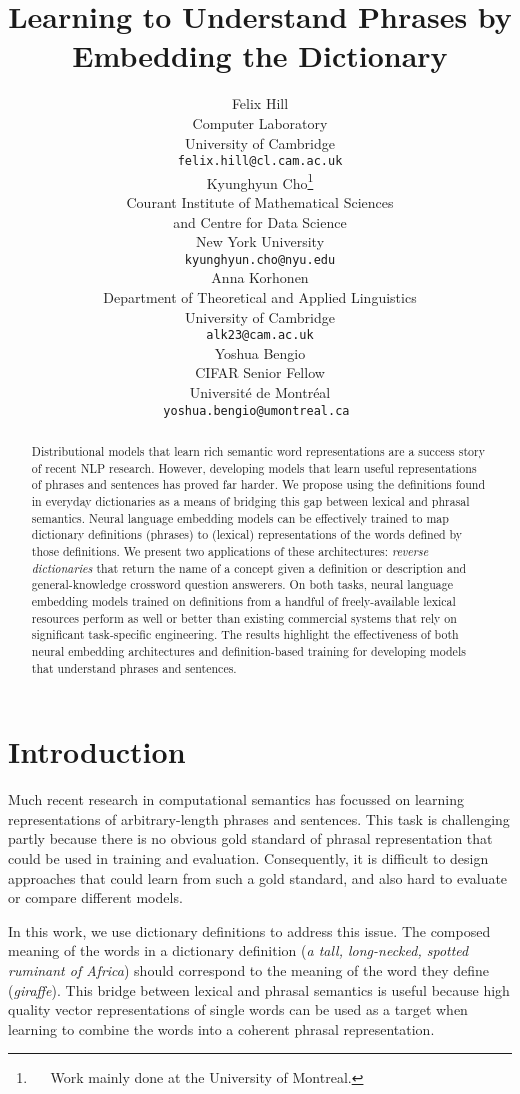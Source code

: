 \documentclass[11pt,letterpaper]{article}
\title{Learning to Understand Phrases by Embedding the Dictionary}
\author{Felix Hill\\
  Computer Laboratory \\
  University of Cambridge \\
  {\tt felix.hill@cl.cam.ac.uk} \\
  \And
  Kyunghyun Cho\thanks{
      ~~
      Work mainly done at the University of Montreal.
  }\\
Courant Institute of Mathematical Sciences \\
and Centre for Data Science \\
New York University \\ 
  {\tt kyunghyun.cho@nyu.edu} \\
  \AND
Anna Korhonen \\
Department of Theoretical and Applied Linguistics \\
University of Cambridge \\
{\tt alk23@cam.ac.uk} \\
  \And
Yoshua Bengio \\
CIFAR Senior Fellow \\
Universit\'{e} de Montr\'{e}al \\
{\tt yoshua.bengio@umontreal.ca }
}
\date{}
\begin{document}
\maketitle

\begin{abstract}

Distributional models that learn rich semantic word representations are a success story of recent NLP research. However, developing models that learn useful representations of phrases and sentences has proved far harder. We propose using the definitions found in everyday dictionaries as a means of bridging this gap between lexical and phrasal semantics. Neural language embedding models can be effectively trained to map dictionary definitions (phrases) to (lexical) representations of the words defined by those definitions. We present two applications of these architectures: \emph{reverse dictionaries} that return the name of a concept given a definition or description and general-knowledge crossword question answerers. On both tasks, neural language embedding models trained on definitions from a handful of freely-available lexical resources perform as well or better than existing commercial systems that rely on significant task-specific engineering. The results highlight the effectiveness of both neural embedding architectures and definition-based training for developing models that understand phrases and sentences. 

\end{abstract}


\section{Introduction}

Much recent research in computational semantics has focussed on learning representations of arbitrary-length phrases and sentences. This task is challenging partly because there is no obvious gold standard of phrasal representation that could be used in training and evaluation. Consequently, it is difficult to design approaches that could learn from such a gold standard, and also hard to evaluate or compare different models.

In this work, we use dictionary definitions to address this issue. The composed meaning of the words in a dictionary definition (\emph{a tall, long-necked, spotted ruminant of Africa}) should correspond to the meaning of the word they define (\emph{giraffe}). This bridge between lexical and phrasal semantics is useful because high quality vector representations of single words can be used as a target when learning to combine the words into a coherent phrasal representation.
 
\end{document}
